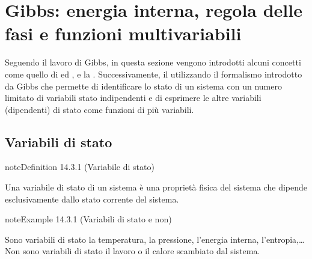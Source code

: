 \documentclass[letterpaper,10pt,italian]{jupyterBook}
\begin{document}
\section{Gibbs: energia interna, regola delle fasi e funzioni multi\sphinxhyphen{}variabili}
\label{\detokenize{ch/thermodynamics/principles-gibbs-phase-rule:gibbs-energia-interna-regola-delle-fasi-e-funzioni-multi-variabili}}\label{\detokenize{ch/thermodynamics/principles-gibbs-phase-rule:physics-hs-thermodynamics-foundation-principles-gibbs-phase-rule}}\label{\detokenize{ch/thermodynamics/principles-gibbs-phase-rule::doc}}
\sphinxAtStartPar
Seguendo il lavoro di Gibbs, in questa sezione vengono introdotti alcuni concetti come quello di {\hyperref[\detokenize{ch/thermodynamics/principles-gibbs-phase-rule:physics-hs-thermodynamics-foundation-principles-gibbs-phase-rule-state-vars}]{}} ed {\hyperref[\detokenize{ch/thermodynamics/principles-gibbs-phase-rule:physics-hs-thermodynamics-foundation-principles-gibbs-phase-rule-internal-energy}]{}}, e la {\hyperref[\detokenize{ch/thermodynamics/principles-gibbs-phase-rule:physics-hs-thermodynamics-foundation-principles-gibbs-phase-rule-gibbs-phase-rule}]{}}. Successivamente, il {\hyperref[\detokenize{ch/thermodynamics/principles-gibbs-phase-rule:physics-hs-thermodynamics-foundation-principles-gibbs-phase-rule-first}]{}} utilizzando il formalismo introdotto da Gibbs che permette di identificare lo stato di un sistema con un numero limitato di variabili stato indipendenti e di esprimere le altre variabili (dipendenti) di stato come funzioni di più variabili.


\subsection{Variabili di stato}
\label{\detokenize{ch/thermodynamics/principles-gibbs-phase-rule:variabili-di-stato}}\label{\detokenize{ch/thermodynamics/principles-gibbs-phase-rule:physics-hs-thermodynamics-foundation-principles-gibbs-phase-rule-state-vars}}\label{ch/thermodynamics/principles-gibbs-phase-rule:definition-0}
\begin{sphinxadmonition}{note}{Definition 14.3.1 (Variabile di stato)}



\sphinxAtStartPar
Una variabile di stato di un sistema è una proprietà fisica del sistema che dipende esclusivamente dallo stato corrente del sistema.
\end{sphinxadmonition}
\label{ch/thermodynamics/principles-gibbs-phase-rule:example-1}
\begin{sphinxadmonition}{note}{Example 14.3.1 (Variabili di stato e non)}



\sphinxAtStartPar
Sono variabili di stato la temperatura, la pressione, l’energia interna, l’entropia,…
Non sono variabili di stato il lavoro o il calore scambiato dal sistema. 
\end{sphinxadmonition}
\end{document}
